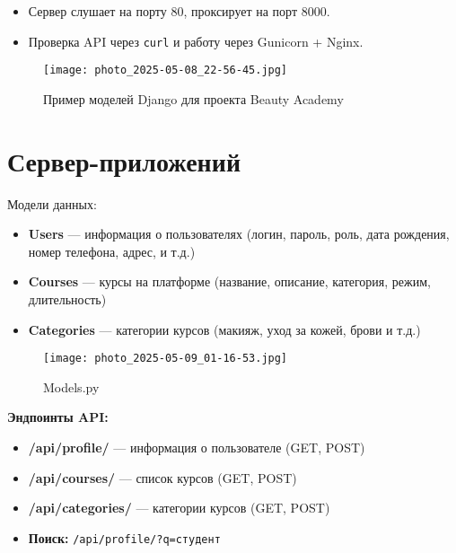 \documentclass[a4paper,12pt]{article}
\begin{document}
\begin{itemize}[leftmargin=1.2cm]
\begin{itemize}
    \item Сервер слушает на порту 80, проксирует на порт 8000.
    \item Проверка API через \texttt{curl} и работу через Gunicorn + Nginx.
\end{itemize}

\vspace{1em}
\begin{figure}[H]
    \centering
    \texttt{[image: photo\_2025-05-08\_22-56-45.jpg]}
    \caption{Пример моделей Django для проекта Beauty Academy}
    \label{fig:nginx-config}
\end{figure}

\section{Сервер-приложений}

Модели данных:

\begin{itemize}
    \item \textbf{Users} — информация о пользователях (логин, пароль, роль, дата рождения, номер телефона, адрес, и т.д.)
    \item \textbf{Courses} — курсы на платформе (название, описание, категория, режим, длительность)
    \item \textbf{Categories} — категории курсов (макияж, уход за кожей, брови и т.д.)
\end{itemize}

\vspace{1em}
\noindent \textbf{}

\begin{figure}[H]
    \centering
    \texttt{[image: photo\_2025-05-09\_01-16-53.jpg]}
    \caption{Models.py}
    \label{fig:nginx-config}
\end{figure}

\vspace{1em}
\textbf{Эндпоинты API:}

\begin{itemize}
    \item \textbf{/api/profile/} — информация о пользователе (GET, POST)
    \item \textbf{/api/courses/} — список курсов (GET, POST)
    \item \textbf{/api/categories/} — категории курсов (GET, POST)
    \item \textbf{Поиск:} \texttt{/api/profile/?q=студент}
\end{itemize}


\end{itemize}
\end{document}
